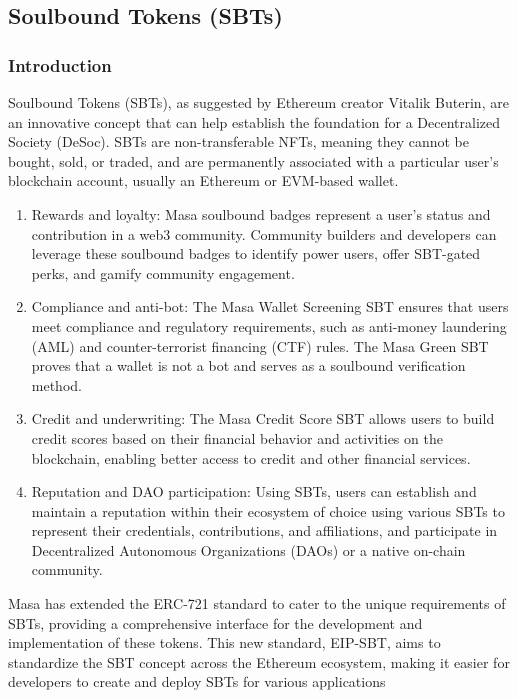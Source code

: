 \documentclass{article}
\begin{document}
\subsection{Soulbound Tokens (SBTs)}
\subsubsection{Introduction}
Soulbound Tokens (SBTs), as suggested by Ethereum creator Vitalik Buterin, are an innovative concept that can help establish the foundation for a Decentralized Society (DeSoc). SBTs are non-transferable NFTs, meaning they cannot be bought, sold, or traded, and are permanently associated with a particular user's blockchain account, usually an Ethereum or EVM-based wallet.

\begin{enumerate}[label=\arabic*.]
    \item Rewards and loyalty: Masa soulbound badges represent a user’s status and contribution in a web3 community. Community builders and developers can leverage these soulbound badges to identify power users, offer SBT-gated perks, and gamify community engagement.
    \item Compliance and anti-bot: The Masa Wallet Screening SBT ensures that users meet compliance and regulatory requirements, such as anti-money laundering (AML) and counter-terrorist financing (CTF) rules. The Masa Green SBT proves that a wallet is not a bot and serves as a soulbound verification method.
    \item Credit and underwriting: The Masa Credit Score SBT allows users to build credit scores based on their financial behavior and activities on the blockchain, enabling better access to credit and other financial services.
    \item Reputation and DAO participation: Using SBTs, users can establish and maintain a reputation within their ecosystem of choice using various SBTs to represent their credentials, contributions, and affiliations, and participate in Decentralized Autonomous Organizations (DAOs) or a native on-chain community.
  \end{enumerate}

Masa has extended the ERC-721 standard to cater to the unique requirements of SBTs, providing a comprehensive interface for the development and implementation of these tokens. This new standard, EIP-SBT, aims to standardize the SBT concept across the Ethereum ecosystem, making it easier for developers to create and deploy SBTs for various applications
\end{document}
